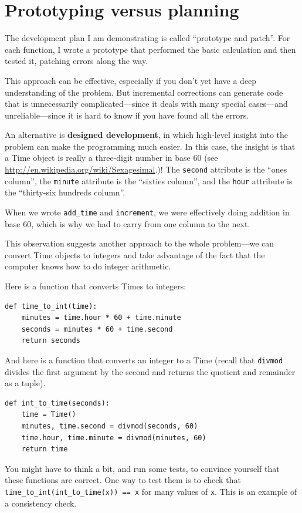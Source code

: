 \documentclass[10pt]{book}
\begin{document}
\section{Prototyping versus planning}
\label{prototype}

The development plan I am demonstrating is called ``prototype and
patch''.  For each function, I wrote a prototype that performed the
basic calculation and then tested it, patching errors along the
way.

This approach can be effective, especially if you don't yet have a
deep understanding of the problem.  But incremental corrections can
generate code that is unnecessarily complicated---since it deals with
many special cases---and unreliable---since it is hard to know if you
have found all the errors.

An alternative is {\bf designed development}, in which high-level
insight into the problem can make the programming much easier.  In
this case, the insight is that a Time object is really a three-digit
number in base 60 (see \url{http://en.wikipedia.org/wiki/Sexagesimal}.)!  The
{\tt second} attribute is the ``ones column'', the {\tt minute}
attribute is the ``sixties column'', and the {\tt hour} attribute is
the ``thirty-six hundreds column''.

When we wrote \verb"add_time" and {\tt increment}, we were effectively
doing addition in base 60, which is why we had to carry from one
column to the next.

This observation suggests another approach to the whole problem---we
can convert Time objects to integers and take advantage of the fact
that the computer knows how to do integer arithmetic.  

Here is a function that converts Times to integers:

\begin{verbatim}
def time_to_int(time):
    minutes = time.hour * 60 + time.minute
    seconds = minutes * 60 + time.second
    return seconds
\end{verbatim}
%
And here is a function that converts an integer to a Time
(recall that {\tt divmod} divides the first argument by the second
and returns the quotient and remainder as a tuple).

\begin{verbatim}
def int_to_time(seconds):
    time = Time()
    minutes, time.second = divmod(seconds, 60)
    time.hour, time.minute = divmod(minutes, 60)
    return time
\end{verbatim}
%
You might have to think a bit, and run some tests, to convince
yourself that these functions are correct.  One way to test them is to
check that \verb"time_to_int(int_to_time(x)) == x" for many values of
{\tt x}.  This is an example of a consistency check.
\end{document}

